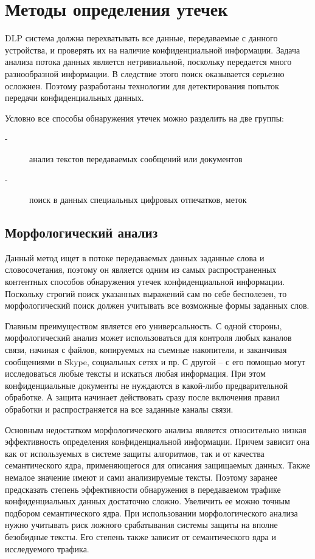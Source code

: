 \section{Методы определения утечек}

DLP система должна перехватывать все данные, передаваемые с данного устройства, и проверять их на наличие конфиденциальной информации. Задача анализа потока данных является нетривиальной, поскольку передается много разнообразной информации. В следствие этого поиск оказывается серьезно осложнен. Поэтому разработаны технологии для детектирования попыток передачи конфиденциальных данных.

Условно все способы обнаружения утечек можно разделить на две группы:

\begin{description}
	\item[-]
	    анализ текстов передаваемых сообщений или документов
	\item[-] 
	    поиск в данных специальных цифровых отпечатков, меток	    
\end{description}


\subsection{Морфологический анализ}

Данный метод ищет в потоке передаваемых данных  заданные слова и словосочетания, поэтому он является одним из самых распространенных контентных способов обнаружения утечек конфиденциальной информации.  Поскольку строгий поиск указанных выражений сам по себе бесполезен, то морфологический поиск должен учитывать все возможные формы заданных слов.

Главным преимуществом является его универсальность. С одной стороны, морфологический анализ может использоваться для контроля любых каналов связи, начиная с файлов, копируемых на съемные накопители, и заканчивая сообщениями в Skype, социальных сетях и пр. С другой – с его помощью могут исследоваться любые тексты и искаться любая информация. При этом конфиденциальные документы не нуждаются в какой-либо предварительной обработке. А защита начинает действовать сразу после включения правил обработки и распространяется на все заданные каналы связи.

Основным недостатком морфологического анализа является относительно низкая эффективность определения конфиденциальной информации. Причем зависит она как от используемых в системе защиты алгоритмов, так и от качества семантического ядра, применяющегося для описания защищаемых данных. Также немалое значение имеют и сами анализируемые тексты. Поэтому заранее предсказать степень эффективности обнаружения в передаваемом трафике конфиденциальных данных достаточно сложно. Увеличить ее можно точным подбором семантического ядра. При использовании морфологического анализа нужно учитывать риск ложного срабатывания системы защиты на вполне безобидные тексты. Его степень также зависит от семантического ядра и исследуемого трафика.

